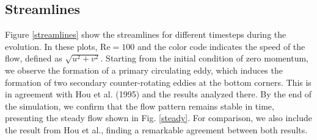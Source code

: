 \documentclass[11pt]{article}
\newcommand{\Rey}{\text{Re}}
\begin{document}
\subsection{Streamlines}

Figure \ref{streamlines} show the streamlines for different timesteps during the evolution. In these plots, $\Rey = 100$ and the color code indicates the speed of the flow, defined as $\sqrt{u^2 + v^2}$. Starting from the initial condition of zero momentum, we observe the formation of a primary circulating eddy, which induces the formation of two secondary counter-rotating eddies at the bottom corners. This is in agreement with Hou et al. (1995) and the results analyzed there. By the end of the simulation, we confirm that the flow pattern remains stable in time, presenting the steady flow shown in Fig. \ref{steady}. For comparison, we also include the result from Hou et al., finding a remarkable agreement between both results.
\end{document}
